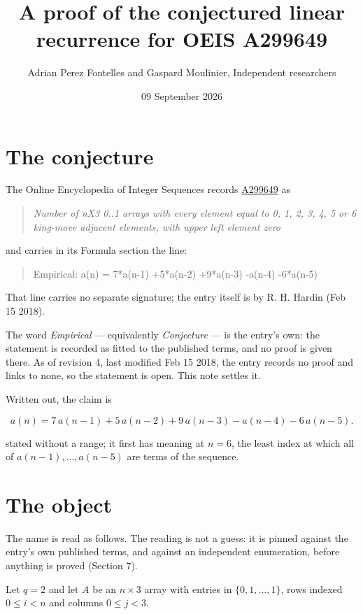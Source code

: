 \documentclass[11pt]{article}
\title{A proof of the conjectured linear recurrence for OEIS A299649}
\author{Adrian Perez Fontelles and Gaspard Moulinier, Independent researchers}
\date{09 September 2026}
\theoremstyle{definition}
\begin{document}
\maketitle
\section{The conjecture}

The Online Encyclopedia of Integer Sequences records \href{https://oeis.org/A299649}{A299649} as

\begin{quote}\itshape Number of nX3 0..1 arrays with every element equal to 0, 1, 2, 3, 4, 5 or 6 king-move adjacent elements, with upper left element zero\end{quote}

and carries in its Formula section the line:

\begin{quote}\ttfamily Empirical: a(n) = 7*a(n-1) +5*a(n-2) +9*a(n-3) -a(n-4) -6*a(n-5)\end{quote}

That line carries no separate signature; the entry itself is by R. H. Hardin (Feb 15 2018).

The word {\itshape Empirical} --- equivalently {\itshape Conjecture} --- is the entry's own: the statement is recorded as fitted to the published terms, and no proof is given there. As of revision 4, last modified Feb 15 2018, the entry records no proof and links to none, so the statement is open. This note settles it.

Written out, the claim is

\[a(n) = 7\,a(n-1) + 5\,a(n-2) + 9\,a(n-3) - a(n-4) - 6\,a(n-5).\]

stated without a range; it first has meaning at $n = 6$, the least index at which all of $a(n-1),\dots,a(n-5)$ are terms of the sequence.

\section{The object}

The name is read as follows. The reading is not a guess: it is pinned against the entry's own published terms, and against an independent enumeration, before anything is proved (Section 7).

Let $q = 2$ and let $A$ be an $n \times 3$ array with entries in $\{0,1,\dots,1\}$, rows indexed $0 \le i < n$ and columns $0 \le j < 3$.
\end{document}
